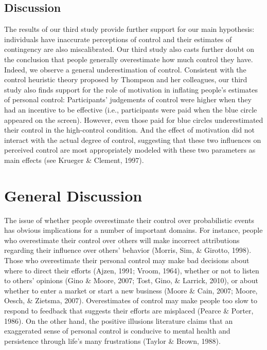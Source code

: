 \documentclass[USenglish,letterpaper,12pt,extrafontsizes,oneside,onecolumn,final]{memoir}
\begin{document}
\subsection{Discussion} 
The results of our third study provide further support for our main hypothesis: individuals have inaccurate perceptions of control and their estimates of contingency are also miscalibrated. Our third study also casts further doubt on the conclusion that people generally overestimate how much control they have. Indeed, we observe a general underestimation of control. Consistent with the control heuristic theory proposed by Thompson and her colleagues, our third study also finds support for the role of motivation in inflating people's estimates of personal control: Participants' judgements of control were higher when they had an incentive to be effective (i.e., participants were paid when the blue circle appeared on the screen). However, even those paid for blue circles underestimated their control in the high-control condition. And the effect of motivation did not interact with the actual degree of control, suggesting that these two influences on perceived control are most appropriately modeled with these two parameters as main effects (see Krueger \& Clement, 1997). 

\section{General Discussion}
The issue of whether people overestimate their control over probabilistic events has obvious implications for a number of important domains. For instance, people who overestimate their control over others will make incorrect attributions regarding their influence over others' behavior (Morris, Sim, \& Girotto, 1998). Those who overestimate their personal control may make bad decisions about where to direct their efforts (Ajzen, 1991; Vroom, 1964), whether or not to listen to others' opinions (Gino \& Moore, 2007; Tost, Gino, \& Larrick, 2010), or about whether to enter a market or start a new business (Moore \& Cain, 2007; Moore, Oesch, \& Zietsma, 2007). Overestimates of control may make people too slow to respond to feedback that suggests their efforts are misplaced (Pearce \& Porter, 1986). On the other hand, the positive illusions literature claims that an exaggerated sense of personal control is conducive to mental health and persistence through life's many frustrations (Taylor \& Brown, 1988).  
\end{document}
